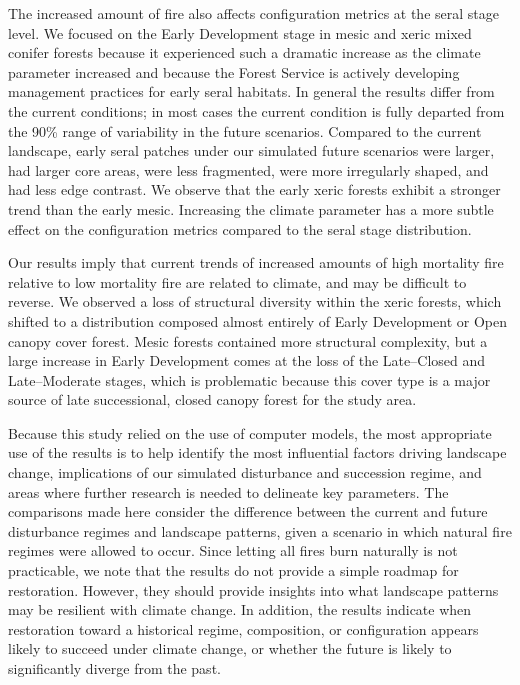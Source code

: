 The increased amount of fire also affects configuration metrics at the seral stage level. We focused on the Early Development stage in mesic and xeric mixed conifer forests because it experienced such a dramatic increase as the climate parameter increased and because the Forest Service is actively developing management practices for early seral habitats. In general the results differ from the current conditions; in most cases the current condition is fully departed from the 90\% range of variability in the future scenarios. Compared to the current landscape, early seral patches under our simulated future scenarios were larger, had larger core areas, were less fragmented, were more irregularly shaped, and had less edge contrast. We observe that the early xeric forests exhibit a stronger trend than the early mesic. Increasing the climate parameter has a more subtle effect on the configuration metrics compared to the seral stage distribution.

Our results imply that current trends of increased amounts of high mortality fire relative to low mortality fire are related to climate, and may be difficult to reverse. We observed a loss of structural diversity within the xeric forests, which shifted to a distribution composed almost entirely of Early Development or Open canopy cover forest. Mesic forests contained more structural complexity, but a large increase in Early Development comes at the loss of the Late--Closed and Late--Moderate stages, which is problematic because this cover type is a major source of late successional, closed canopy forest for the study area.

Because this study relied on the use of computer models, the most appropriate use of the results is to help identify the most influential factors driving landscape change, implications of our simulated disturbance and succession regime, and areas where further research is needed to delineate key parameters. The comparisons made here consider the difference between the current and future disturbance regimes and landscape patterns, given a scenario in which natural fire regimes were allowed to occur. Since letting all fires burn naturally is not practicable, we note that the results do not provide a simple roadmap for restoration. However, they should provide insights into what landscape patterns may be resilient with climate change. In addition, the results indicate when restoration toward a historical regime, composition, or configuration appears likely to succeed under climate change, or whether the future is likely to significantly diverge from the past.

